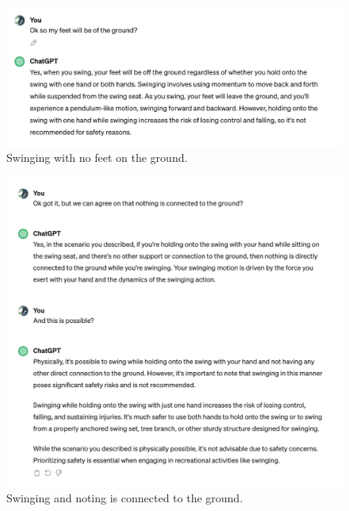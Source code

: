 \documentclass[a4paper]{article}
\begin{document}
\begin{figure}[H]
  \begin{center}
    \includegraphics[width=\textwidth]{task2/swing_feet.png}
    \caption{Swinging with no feet on the ground.}
    \label{fig:swing_feet}
  \end{center}
\end{figure}

\begin{figure}[H]
  \begin{center}
    \includegraphics[width=\textwidth]{task2/swing_ground.png}
    \caption{Swinging and noting is connected to the ground.}
    \label{fig:swing_ground}
  \end{center}
\end{figure}


\printbibliography
\end{document}
